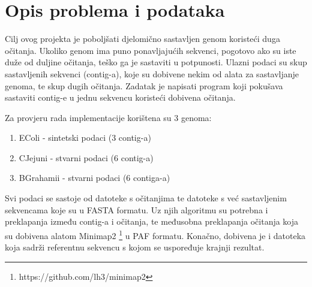 \chapter{Opis problema i podataka}
Cilj ovog projekta je poboljšati djelomično sastavljen genom koristeći duga očitanja. Ukoliko genom ima puno ponavljajućih sekvenci, pogotovo ako su iste duže od duljine očitanja, teško ga je sastaviti u potpunosti. Ulazni podaci su skup sastavljenih sekvenci (contig-a), koje su dobivene nekim od alata za sastavljanje genoma, te skup dugih očitanja. Zadatak je napisati program koji pokušava sastaviti contig-e u jednu sekvencu koristeći dobivena očitanja.

Za provjeru rada implementacije korištena su 3 genoma:
\begin{enumerate}
\item EColi - sintetski podaci (3 contig-a)
\item CJejuni - stvarni podaci (6 contig-a)
\item BGrahamii - stvarni podaci (6 contiga-a)
\end{enumerate}

Svi podaci se sastoje od datoteke s očitanjima te datoteke s već sastavljenim sekvencama koje su u FASTA formatu. Uz njih algoritmu su potrebna i preklapanja između contig-a i očitanja, te međusobna preklapanja očitanja koja su dobivena alatom Minimap2 \footnote{https://github.com/lh3/minimap2} u PAF formatu. Konačno, dobivena je i datoteka koja sadrži referentnu sekvencu s kojom se uspoređuje krajnji rezultat.